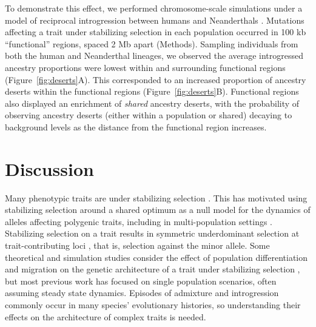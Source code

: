 \documentclass{article}
\begin{document}
To demonstrate this effect, we performed chromosome-scale simulations under a
model of reciprocal introgression between humans and Neanderthals
\citep[Figure~\ref{fig:human-neand-h2}A,][]{harris2023diverse}. Mutations
affecting a trait under stabilizing selection in each population occurred in
100 kb ``functional'' regions, spaced 2 Mb apart (Methods). Sampling
individuals from both the human and Neanderthal lineages, we observed the
average introgressed ancestry proportions were lowest within and surrounding
functional regions (Figure~\ref{fig:deserts}A). This corresponded to an
increased proportion of ancestry deserts within the functional regions
(Figure~\ref{fig:deserts}B). Functional regions also displayed an enrichment
of \emph{shared} ancestry deserts, with the probability of observing ancestry
deserts (either within a population or shared) decaying to background levels as
the distance from the functional region increases.

\section*{Discussion}

Many phenotypic traits are under stabilizing selection \citep{hodgins2015gene,
sanjak2018evidence, sella2019thinking}. This has motivated using stabilizing
selection around a shared optimum as a null model for the dynamics of alleles
affecting polygenic traits, including in multi-population settings
\citep{yair2022population}. Stabilizing selection on a trait results in
symmetric underdominant selection at trait-contributing loci
\citep{robertson1956effect, keightley1988quantitative}, that is, selection
against the minor allele. Some theoretical and simulation studies consider the
effect of population differentiation and migration on the genetic architecture
of a trait under stabilizing selection \citep[e.g.,][]{tufto2000quantitative,
yeaman2011genetic, yair2022population}, but most previous work has focused on
single population scenarios, often assuming steady state dynamics. Episodes of
admixture and introgression commonly occur in many species' evolutionary
histories, so understanding their effects on the architecture of complex traits
is needed.
\end{document}
